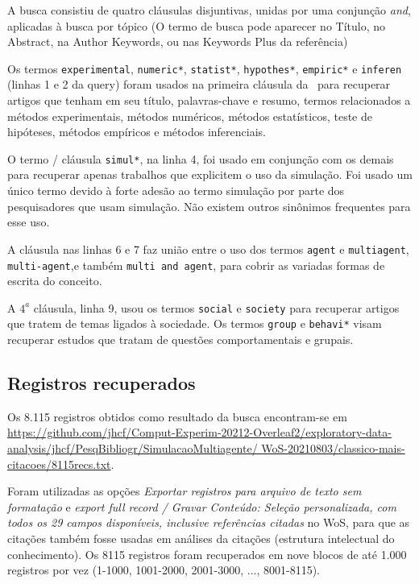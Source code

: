 A busca consistiu de quatro cláusulas disjuntivas, unidas por uma conjunção \textit{and}, aplicadas à busca por tópico (O termo de busca pode aparecer no Título, no Abstract, na Author Keywords, ou nas Keywords Plus da referência)

Os termos \texttt{experimental}, \texttt{numeric*}, \texttt{statist*}, \texttt{hypothes*}, 
\texttt{empiric*}
e \texttt{inferen} (linhas 1 e 2 da query) foram usados na primeira cláusula da \query\  para recuperar artigos que tenham em seu título, palavras-chave e resumo, termos relacionados a métodos experimentais,
métodos numéricos,
métodos estatísticos,
teste de hipóteses,
métodos empíricos e métodos inferenciais.

O termo / cláusula  \texttt{simul*}, na linha 4, foi usado em conjunção com os demais para recuperar apenas trabalhos que explicitem o uso da simulação.
Foi usado um único termo devido à forte adesão ao termo simulação por parte dos pesquisadores que usam simulação. Não existem outros sinônimos frequentes para esse uso.

A cláusula nas linhas 6 e 7 faz união entre o uso dos termos \texttt{agent} e \texttt{multiagent}, \texttt{multi-agent},e  também \texttt{multi and agent}, para cobrir as variadas formas de escrita do conceito.

A $4^{a}$ cláusula, linha 9,  usou os termos \texttt{social} e \texttt{society} para recuperar artigos que tratem de temas ligados à sociedade.
Os termos \texttt{group} e \texttt{behavi*} visam recuperar estudos que tratam de questões comportamentais e grupais.

\subsection{Registros recuperados}

Os 8.115 registros obtidos como resultado da busca encontram-se em \url{https://github.com/jhcf/Comput-Experim-20212-Overleaf2/exploratory-data-analysis/jhcf/PesqBibliogr/SimulacaoMultiagente/ WoS-20210803/classico-mais-citacoes/8115recs.txt}. 

Foram utilizadas as opções \textit{Exportar registros para arquivo de texto sem formatação} e \textit{export full record / Gravar Conteúdo: Seleção personalizada, com todos os 29 campos disponíveis, inclusive referências citadas} no WoS, para que as citações também fosse usadas em análises da citações (estrutura intelectual do conhecimento). Os 8115 registros foram recuperados em nove blocos de até 1.000 registros por vez (1-1000, 1001-2000, 2001-3000, ..., 8001-8115).

